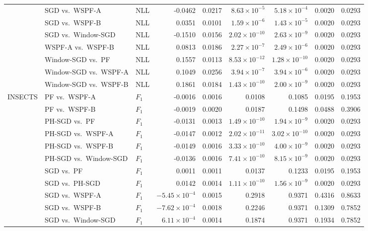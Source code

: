 {\begin{longtable}{@{}lllrrrrrr@{}}
 & SGD vs.\ WSPF-A & NLL & -0.0462 & 0.0217 & $8.63\times 10^{-5}$ & $5.18\times 10^{-4}$ & 0.0020 & 0.0293 \\
 & SGD vs.\ WSPF-B & NLL & 0.0351 & 0.0101 & $1.59\times 10^{-6}$ & $1.43\times 10^{-5}$ & 0.0020 & 0.0293 \\
 & SGD vs.\ Window-SGD & NLL & -0.1510 & 0.0156 & $2.02\times 10^{-10}$ & $2.63\times 10^{-9}$ & 0.0020 & 0.0293 \\
 & WSPF-A vs.\ WSPF-B & NLL & 0.0813 & 0.0186 & $2.27\times 10^{-7}$ & $2.49\times 10^{-6}$ & 0.0020 & 0.0293 \\
 & Window-SGD vs.\ PF & NLL & 0.1557 & 0.0113 & $8.53\times 10^{-12}$ & $1.28\times 10^{-10}$ & 0.0020 & 0.0293 \\
 & Window-SGD vs.\ WSPF-A & NLL & 0.1049 & 0.0256 & $3.94\times 10^{-7}$ & $3.94\times 10^{-6}$ & 0.0020 & 0.0293 \\
 & Window-SGD vs.\ WSPF-B & NLL & 0.1861 & 0.0184 & $1.43\times 10^{-10}$ & $2.00\times 10^{-9}$ & 0.0020 & 0.0293 \\
\midrule
INSECTS & PF vs.\ WSPF-A & $F_1$ & -0.0016 & 0.0016 & 0.0108 & 0.1085 & 0.0195 & 0.1953 \\
 & PF vs.\ WSPF-B & $F_1$ & -0.0019 & 0.0020 & 0.0187 & 0.1498 & 0.0488 & 0.3906 \\
 & PH-SGD vs.\ PF & $F_1$ & -0.0131 & 0.0013 & $1.49\times 10^{-10}$ & $1.94\times 10^{-9}$ & 0.0020 & 0.0293 \\
 & PH-SGD vs.\ WSPF-A & $F_1$ & -0.0147 & 0.0012 & $2.02\times 10^{-11}$ & $3.02\times 10^{-10}$ & 0.0020 & 0.0293 \\
 & PH-SGD vs.\ WSPF-B & $F_1$ & -0.0149 & 0.0016 & $3.33\times 10^{-10}$ & $4.00\times 10^{-9}$ & 0.0020 & 0.0293 \\
 & PH-SGD vs.\ Window-SGD & $F_1$ & -0.0136 & 0.0016 & $7.41\times 10^{-10}$ & $8.15\times 10^{-9}$ & 0.0020 & 0.0293 \\
 & SGD vs.\ PF & $F_1$ & 0.0011 & 0.0011 & 0.0137 & 0.1233 & 0.0195 & 0.1953 \\
 & SGD vs.\ PH-SGD & $F_1$ & 0.0142 & 0.0014 & $1.11\times 10^{-10}$ & $1.56\times 10^{-9}$ & 0.0020 & 0.0293 \\
 & SGD vs.\ WSPF-A & $F_1$ & $-5.45\times 10^{-4}$ & 0.0015 & 0.2918 & 0.9371 & 0.4316 & 0.8633 \\
 & SGD vs.\ WSPF-B & $F_1$ & $-7.62\times 10^{-4}$ & 0.0018 & 0.2246 & 0.9371 & 0.1309 & 0.7852 \\
 & SGD vs.\ Window-SGD & $F_1$ & $6.11\times 10^{-4}$ & 0.0014 & 0.1874 & 0.9371 & 0.1934 & 0.7852 \\

\end{longtable}}

